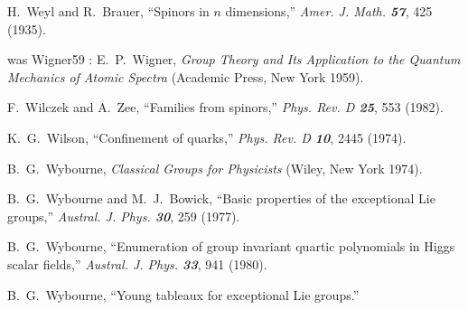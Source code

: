 
 H.~Weyl and R.~Brauer,
    ``Spinors in $n$ dimensions,''
    {\em Amer. J. Math.   \bf 57}, 425 (1935).

was Wigner59 :
 E.~P.~Wigner,
    {\em Group Theory and Its Application to the Quantum Mechanics
        of Atomic Spectra}
    (Academic Press, New York 1959).

F.~Wilczek and A.~Zee,
``Families from spinors,''
{\em Phys.  Rev.    D \bf 25}, 553 (1982).

K.~G.~Wilson,
``Confinement of quarks,''
{\em Phys.  Rev.    D \bf 10}, 2445 (1974).


 B.~G.~Wybourne,
    {\em Classical Groups for Physicists}
    (Wiley, New York 1974).

 B.~G.~Wybourne and M.~J.~Bowick,
    ``Basic properties of the exceptional Lie groups,''
    {\em Austral.  J.  Phys.    \bf 30}, 259 (1977).

 B.~G.~Wybourne,
``Enumeration of group invariant quartic polynomials in Higgs scalar fields,''
    {\em Austral.  J.  Phys.    \bf 33}, 941 (1980).

B.~G.~Wybourne,
        ``Young tableaux for exceptional Lie groups.''




